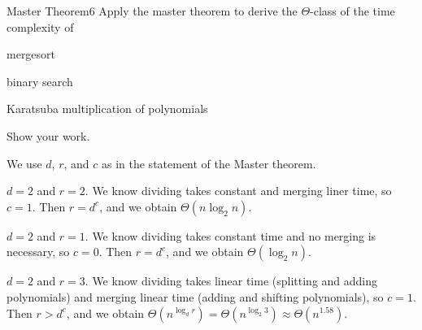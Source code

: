 \documentclass[a4paper]{article}
\begin{document}
\begin{problem}{Master Theorem}{6}
Apply the master theorem to derive the $\Theta$-class of the time complexity of
\begin{compactenum}
  \item mergesort
  \item binary search
  \item Karatsuba multiplication of polynomials
\end{compactenum}
Show your work.

\begin{solution}
We use $d$, $r$, and $c$ as in the statement of the Master theorem.
\begin{compactenum}
  \item $d=2$ and $r=2$. We know dividing takes constant and merging liner time, so $c=1$. Then $r=d^c$, and we obtain $\Theta(n\log_2 n)$.
  \item $d=2$ and $r=1$. We know dividing takes constant time and no merging is necessary, so $c=0$. Then $r=d^c$, and we obtain $\Theta(\log_2 n)$.
  \item $d=2$ and $r=3$. We know dividing takes linear time (splitting and adding polynomials) and merging linear time (adding and shifting polynomials), so $c=1$.
  Then $r>d^c$, and we obtain $\Theta(n^{\log_d r})=\Theta(n^{\log_2 3})\approx\Theta(n^{1.58})$.
\end{compactenum}

\end{solution}

\end{problem}
\end{document}
